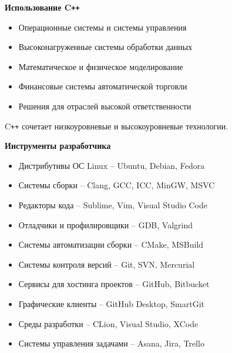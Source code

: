\documentclass{beamer} %
\begin{document}
\begin{frame}{\bf Использование C\texttt{++}}
    
    \begin{itemize}

        \item Операционные системы и системы управления

        \item Высоконагруженные системы обработки данных

        \item Математическое и физическое моделирование

        \item Финансовые системы автоматической торговли

        \item Решения для отраслей высокой ответственности
        
    \end{itemize}

    \begin{block}
    \justifying C\texttt{++} сочетает низкоуровневые и высокоуровневые технологии.
    \end{block}
    
\end{frame}

\begin{frame}{\bf Инструменты разработчика}

    \begin{itemize}

        \item Дистрибутивы ОС Linux -- Ubuntu, Debian, Fedora

        \item Системы сборки -- Clang, GCC, ICC, MinGW, MSVC

        \item Редакторы кода -- Sublime, Vim, Visual Studio Code

        \item Отладчики и профилировщики -- GDB, Valgrind

        \item Системы автоматизации сборки -- CMake, MSBuild

        \item Системы контроля версий -- Git, SVN, Mercurial

        \item Сервисы для хостинга проектов -- GitHub, Bitbucket

        \item Графические клиенты -- GitHub Desktop, SmartGit

        \item Среды разработки -- CLion, Visual Studio, XCode

        \item Системы управления задачами -- Asana, Jira, Trello

    \end{itemize}
    
\end{frame}
\end{document}
